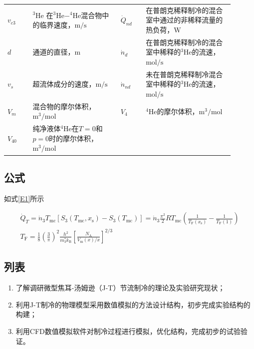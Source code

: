 \begin{table}[!htbp]
\begin{tabular}{m{0.1\linewidth}m{0.35\linewidth}m{0.1\linewidth}m{0.35\linewidth}}
		$v_{c3}$ & $\mathrm{^3He}$ 在$\mathrm{^3He-^4He}$混合物中的临界速度，$\mathrm{m/s}$ & $\dot{Q}_{nd}$ & 在普朗克稀释制冷的混合室中通过的非稀释流量的热负荷，$\mathrm{W}$ \\
		$d$ & 通道的直径，$\mathrm{m}$ & $\dot{n}_d$ & 在普朗克稀释制冷的混合室中稀释的$\mathrm{^3He}$的流速，$\mathrm{mol/s}$ \\
		$v_s$ & 超流体成分的速度，$\mathrm{m/s}$ & $\dot{n}_{nd}$ & 未在普朗克稀释制冷混合室中稀释的$\mathrm{^3He}$的流速，$\mathrm{mol/s}$ \\ 
		$V_m$ & 混合物的摩尔体积，$\mathrm{m^3/mol}$ & $V_4$ & $\mathrm{^4He}$的摩尔体积，$\mathrm{m^3/mol}$ \\
		$V_{40}$ & 纯净液体$\mathrm{^4He}$在$T=0$和$p=0$时的摩尔体积，$\mathrm{m^3/mol}$ & & \\
		\bottomrule
	\end{tabular}	
\end{table}


\subsection{公式}

如式\eqref{E1}所示

\begin{gather}
	\dot{Q}_{T}=\dot{n}_{3} T_{\mathrm{mc}}\left[S_{3}\left(T_{\mathrm{mc}}, x_{\mathrm{s}}\right)-S_{3}\left(T_{\mathrm{mc}}\right)\right]=\dot{n}_{3} \frac{\pi^{2}}{2} R T_{\mathrm{mc}}\left(\frac{1}{T_{\mathrm{F}}\left(x_{\mathrm{s}}\right)}-\frac{1}{T_{\mathrm{F}}(1)}\right) \label{2E1} \\
	T_{\mathrm{F}}=\frac{1}{8}\left(\frac{3}{\pi}\right)^{2} \frac{h^{2}}{m_{3}^{*} k_{\mathrm{B}}}\left[\frac{N_{\mathrm{A}}}{V_{\mathrm{m}}(x) / x}\right]^{2 / 3} \label{E1}
\end{gather}

\subsection{列表}

\begin{enumerate}[label=(\arabic*)]
	\item 了解调研微型焦耳-汤姆逊（J-T）节流制冷的理论及实验研究现状；
	\item 利用J-T制冷的物理模型采用数值模拟的方法设计结构，初步完成实验结构的构建；
	\item 利用CFD数值模拟软件对制冷过程进行模拟，优化结构，完成初步的试验验证。
\end{enumerate}

